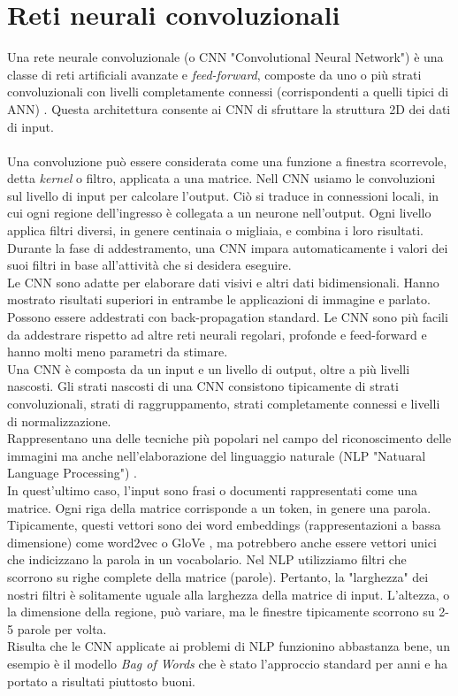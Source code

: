 \section{Reti neurali convoluzionali}
\label{sec:cnn}
Una rete neurale convoluzionale (o CNN "Convolutional Neural Network") è una classe di reti artificiali avanzate e \emph{feed-forward}, composte da uno o più strati convoluzionali con livelli completamente connessi (corrispondenti a quelli tipici di ANN) \cite{kim2014convolutional}. Questa architettura consente ai CNN di sfruttare la struttura 2D dei dati di input.\\\\
Una convoluzione può essere considerata come una funzione a finestra scorrevole, detta \emph{kernel} o filtro, applicata a una matrice. 
Nell CNN usiamo le convoluzioni sul livello di input per calcolare l'output. Ciò si traduce in connessioni locali, in cui ogni regione dell'ingresso è collegata a un neurone nell'output. Ogni livello applica filtri diversi, in genere centinaia o migliaia, e combina i loro risultati. Durante la fase di addestramento, una CNN impara automaticamente i valori dei suoi filtri in base all'attività che si desidera eseguire. \\
Le CNN sono adatte per elaborare dati visivi e altri dati bidimensionali. Hanno mostrato risultati superiori in entrambe le applicazioni di immagine e parlato. Possono essere addestrati con back-propagation standard. Le CNN sono più facili da addestrare rispetto ad altre reti neurali regolari, profonde e feed-forward e hanno molti meno parametri da stimare.\\
Una CNN è composta da un input e un livello di output, oltre a più livelli nascosti. Gli strati nascosti di una CNN consistono tipicamente di strati convoluzionali, strati di raggruppamento, strati completamente connessi e livelli di normalizzazione.\\
Rappresentano una delle tecniche più popolari nel campo del riconoscimento delle immagini ma anche nell'elaborazione del linguaggio naturale (NLP "Natuaral Language Processing") \cite{manning1999foundations,FIXME}.\\
In quest'ultimo caso, l'input sono frasi o documenti rappresentati come una matrice. Ogni riga della matrice corrisponde a un token, in genere una parola. Tipicamente, questi vettori sono dei word embeddings (rappresentazioni a bassa dimensione) come word2vec \cite{mikolov2013distributed} o GloVe \cite{pennington2014glove}, ma potrebbero anche essere vettori unici che indicizzano la parola in un vocabolario. Nel NLP utilizziamo filtri che scorrono su righe complete della matrice (parole). Pertanto, la "larghezza" dei nostri filtri è solitamente uguale alla larghezza della matrice di input. L'altezza, o la dimensione della regione, può variare, ma le finestre tipicamente scorrono su 2-5 parole per volta. \\
Risulta che le CNN applicate ai problemi di NLP funzionino abbastanza bene, un esempio è il modello \emph{Bag of Words} che è stato l'approccio standard per anni e ha portato a risultati piuttosto buoni.
